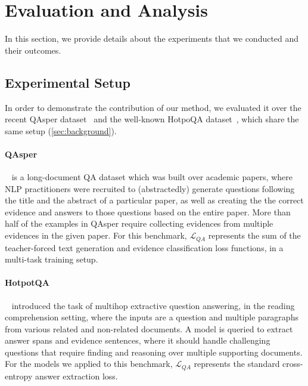 



\section{Evaluation and Analysis}
In this section, we provide details about the experiments that we conducted and their outcomes. 
\subsection{Experimental Setup}


In order to demonstrate the contribution of our method, we evaluated it over the recent QAsper dataset~\cite{dasigi-etal-2021-dataset} and the well-known HotpoQA dataset~\cite{yang-etal-2018-hotpotqa},
which share the same setup (\sect \ref{sec:background}). 

\paragraph{QAsper}~\cite{dasigi-etal-2021-dataset} is a long-document QA dataset which was built over academic papers, where NLP practitioners were recruited to (abstractedly) generate questions following the title and the abstract of a particular paper, as well as creating the the correct evidence and answers to those questions based on the entire paper. More than half of the examples in QAsper require collecting evidences from multiple evidences in the given paper. For this benchmark, $\mathcal{L}_{QA}$ represents the sum of the teacher-forced text generation and evidence classification loss functions, in a multi-task training setup.


\paragraph{HotpotQA}~\cite{yang-etal-2018-hotpotqa} introduced the task of multihop extractive question answering, in the reading comprehension setting, where the inputs are a question and multiple paragraphs from various related and non-related documents. A model is queried to extract answer spans and evidence sentences, where it should handle challenging questions that require finding and reasoning over multiple supporting documents. For the models we applied to this benchmark, $\mathcal{L}_{QA}$ represents the standard cross-entropy answer extraction loss.

